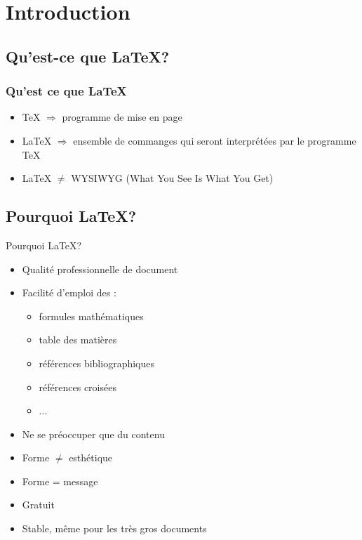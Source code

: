 \documentclass[10pt,svgnames,usenames,table]{beamer} %
\begin{document}

\section{Introduction}
\subsection{Qu'est-ce que \LaTeX{}?}
\begin{frame}
\frametitle{Qu'est ce que \LaTeX}

\begin{itemize}
\item \TeX{} $ \Rightarrow$ programme de mise en page
\vspace{0.5cm}
\item \LaTeX{} $ \Rightarrow$ ensemble de commanges qui seront
 interprétées par le programme \TeX
 \vspace{0.5cm}
\item \LaTeX{} $ \neq$ WYSIWYG (What You See Is What You Get)
\end{itemize}

\end{frame}

\subsection{Pourquoi \LaTeX{}?}
\begin{frame}{Pourquoi \LaTeX{}?}

  \begin{itemize}
  	\item Qualité professionnelle de document
	\item Facilité d'emploi des :
	\begin{itemize}
		\item formules mathématiques
		\item table des matières
		\item références bibliographiques
		\item références croisées
		\item ...
	\end{itemize}
	\item Ne se préoccuper que du contenu
	\item Forme $\neq$ esthétique
	\item Forme = message
	\item Gratuit
	\item Stable, même pour les très gros documents
  \end{itemize}
\end{frame}
\end{document}
